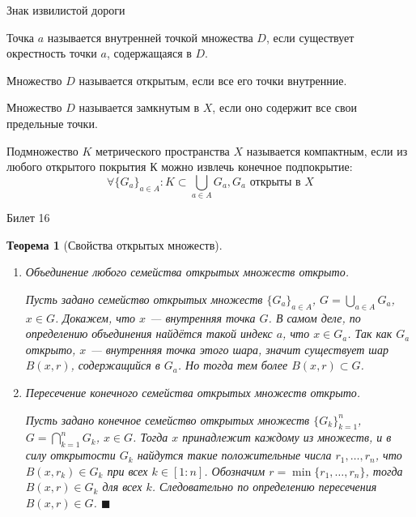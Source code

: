 \documentclass[12pt,a4paper]{article}
\newtheorem*{theorem*}{Теорема}
\begin{document}
\begin{center}
Знак извилистой дороги
\end{center}

Точка $a$ называется внутренней точкой множества $D$, если существует окрестность точки $a$, содержащаяся в $D$.

Множество $D$ называется открытым, если все его точки внутренние.

Множество $D$ называется замкнутым в $X$, если оно содержит все свои предельные точки.

Подмножество $K$ метрического пространства $X$ называется компактным, если из любого открытого покрытия $К$ можно извлечь конечное подпокрытие:
$$
\forall \{G_a\}_{a\in A}: K \subset \bigcup\limits_{a\in A} G_a, G_a \text{ открыты в } X
$$

\begin{center}
Билет 16
\end{center}

\begin{theorem*}[Свойства открытых множеств]
\label{16.1}
\ %
\begin{enumerate}
\item Объединение любого семейства открытых множеств открыто. 

Пусть задано семейство открытых множеств $\{G_a\}_{a \in A}$, $G = \bigcup\limits_{a\in A}{G_a}$, $x \in G$. Докажем, что $x$ --- внутренняя точка $G$. В самом деле, по определению объединения найдётся такой индекс $a$, что $x \in G_a$. Так как $G_a$ открыто, $x$ --- внутренняя точка этого шара, значит существует шар $B(x, r)$, содержащийся в $G_a$. Но тогда тем более $B(x, r) \subset G$.

\item Пересечение конечного семейства открытых множеств открыто. 

Пусть задано конечное семейство открытых множеств $\{G_k\}_{k=1}^{n}$, $G = \bigcap\limits_{k=1}^{n} G_k$, $x \in G$. Тогда $x$ принадлежит каждому из множеств, и в силу открытости $G_k$ найдутся такие положительные числа $r_1, \ldots, r_n$, что $B(x, r_k) \in G_k$ при всех $k \in [1: n]$. Обозначим $r=\min\{r_1, \ldots, r_n\}$, тогда $B(x, r) \in G_k$ для всех $k$. Следовательно по определению пересечения $B(x, r) \in G$. $\blacksquare$
\end{enumerate}
\end{theorem*}
\end{document}
